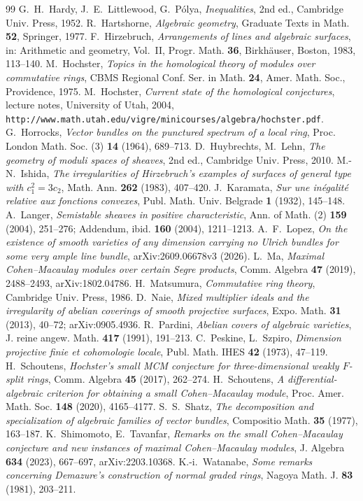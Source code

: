 \begin{thebibliography}{99}
 G.~H.~Hardy, J.~E.~Littlewood, G.~P\'olya, \emph{Inequalities}, 2nd ed., Cambridge Univ. Press, 1952.
 R.~Hartshorne, \emph{Algebraic geometry}, Graduate Texts in Math. \textbf{52}, Springer, 1977.
 F.~Hirzebruch, \emph{Arrangements of lines and algebraic surfaces}, in: Arithmetic and geometry, Vol.~II, Progr. Math. \textbf{36}, Birkh\"auser, Boston, 1983, 113--140.
 M.~Hochster, \emph{Topics in the homological theory of modules over commutative rings}, CBMS Regional Conf. Ser. in Math. \textbf{24}, Amer. Math. Soc., Providence, 1975.
 M.~Hochster, \emph{Current state of the homological conjectures}, lecture notes, University of Utah, 2004, \texttt{http://www.math.utah.edu/vigre/minicourses/algebra/hochster.pdf}.
 G.~Horrocks, \emph{Vector bundles on the punctured spectrum of a local ring}, Proc. London Math. Soc. (3) \textbf{14} (1964), 689--713.
 D.~Huybrechts, M.~Lehn, \emph{The geometry of moduli spaces of sheaves}, 2nd ed., Cambridge Univ. Press, 2010.
 M.-N.~Ishida, \emph{The irregularities of Hirzebruch's examples of surfaces of general type with $c_1^2=3c_2$}, Math. Ann. \textbf{262} (1983), 407--420.
 J.~Karamata, \emph{Sur une in\'egalit\'e relative aux fonctions convexes}, Publ. Math. Univ. Belgrade \textbf{1} (1932), 145--148.
 A.~Langer, \emph{Semistable sheaves in positive characteristic}, Ann. of Math. (2) \textbf{159} (2004), 251--276; Addendum, ibid. \textbf{160} (2004), 1211--1213.
 A.~F.~Lopez, \emph{On the existence of smooth varieties of any dimension carrying no Ulrich bundles for some very ample line bundle}, arXiv:2609.06678v3 (2026).
 L.~Ma, \emph{Maximal Cohen--Macaulay modules over certain Segre products}, Comm. Algebra \textbf{47} (2019), 2488--2493, arXiv:1802.04786.
 H.~Matsumura, \emph{Commutative ring theory}, Cambridge Univ. Press, 1986.
 D.~Naie, \emph{Mixed multiplier ideals and the irregularity of abelian coverings of smooth projective surfaces}, Expo. Math. \textbf{31} (2013), 40--72; arXiv:0905.4936.
 R.~Pardini, \emph{Abelian covers of algebraic varieties}, J. reine angew. Math. \textbf{417} (1991), 191--213.
 C.~Peskine, L.~Szpiro, \emph{Dimension projective finie et cohomologie locale}, Publ. Math. IHES \textbf{42} (1973), 47--119.
 H.~Schoutens, \emph{Hochster's small MCM conjecture for three-dimensional weakly $F$-split rings}, Comm. Algebra \textbf{45} (2017), 262--274.
 H.~Schoutens, \emph{A differential-algebraic criterion for obtaining a small Cohen--Macaulay module}, Proc. Amer. Math. Soc. \textbf{148} (2020), 4165--4177.
 S.~S.~Shatz, \emph{The decomposition and specialization of algebraic families of vector bundles}, Compositio Math. \textbf{35} (1977), 163--187.
 K.~Shimomoto, E.~Tavanfar, \emph{Remarks on the small Cohen--Macaulay conjecture and new instances of maximal Cohen--Macaulay modules}, J. Algebra \textbf{634} (2023), 667--697, arXiv:2203.10368.
 K.-i.~Watanabe, \emph{Some remarks concerning Demazure's construction of normal graded rings}, Nagoya Math. J. \textbf{83} (1981), 203--211.
\end{thebibliography}
